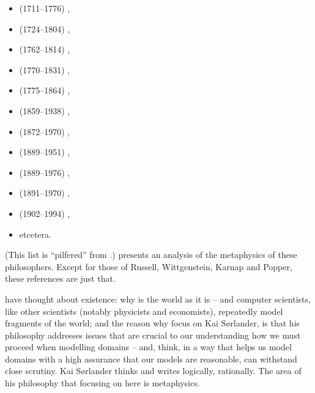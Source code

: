 {{\begin{multicols}{2}
\begin{itemize}
\item {} (1711--1776) \cite{Hume:Dines},
\item {} (1724--1804) \cite{Kant:Dines},
\item {} (1762--1814) \cite{Fichte:Dines},
\item {} (1770--1831) \cite{Hegel:Dines},
\item {} (1775--1864) \cite{Schelling:Dines},
\item {} (1859--1938) \cite{Husserl:Dines},
\item {} (1872--1970) \cite{Rus12,Russell1910-1913,Russell1905,Russell1919},
\item {} (1889--1951) \cite{Wittgenstein21,Wittgenstein58},
\item {} (1889--1976) \cite{Heidegger27},
\item {} (1891--1970) \cite{RudolfCarnap1928,Car37,Car42},
\item {} (1902--1994) \cite{popper-tlosd59,popper-car-tgask63},
\item etcetera.
\end{itemize}
\end{multicols}
\noindent
(This list is ``pilfered''
      from \cite[Pages 33--127]{kaisorlander2016}.) \label{citations-2}
      \cite{kaisorlander2016} presents an analysis of the metaphysics
      of these philosophers. Except for those of Russell, Wittgenstein,
      Karnap and Popper, these references are just that.\normalsize}}{} \nyl  have
      thought about existence: \nyl why is the world as it is -- \nyl and
      computer scientists, \nyl like other scientists (notably
      physicists and economists), \nyl repeatedly model fragments of
      the world;
\mnewfoil
\pind and the reason why  focus on Kai S{\o}rlander, \nyl is
      that his philosophy addresses issues \nyl that are crucial to our
      understanding \nyl {} how we must proceed when modelling domains --
      \nyl and,
       think, in a way that helps us model domains \nyl with a high
      assurance that our models are reasonable, \nyl can withstand close scrutiny.
\pind Kai S{\o}rlander thinks and writes logically, rationally.
\pind The area of his philosophy that  focusing on here is metaphysics.
\afslut
\afslut

